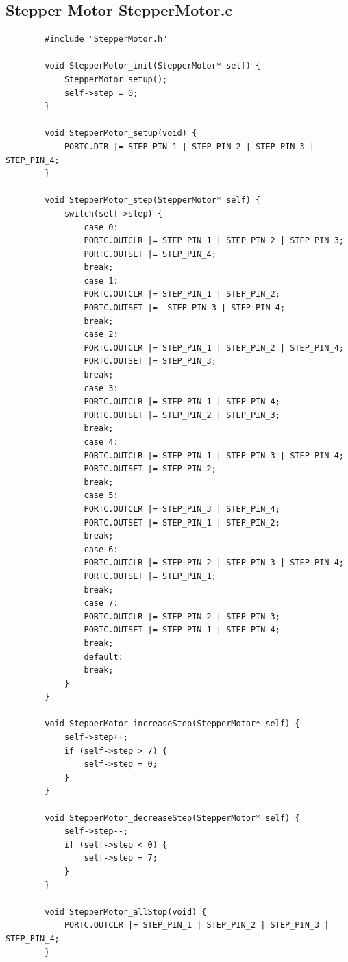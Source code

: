 \documentclass[11pt,a4paper,titlepage]{report}
\begin{document}
	\subsection{Stepper Motor StepperMotor.c}\label{appendix:final_code_stepper_motor_c}
	\begin{lstlisting}
		#include "StepperMotor.h"
		
		void StepperMotor_init(StepperMotor* self) {
			StepperMotor_setup();
			self->step = 0;
		}
		
		void StepperMotor_setup(void) {
			PORTC.DIR |= STEP_PIN_1 | STEP_PIN_2 | STEP_PIN_3 | STEP_PIN_4;
		}
		
		void StepperMotor_step(StepperMotor* self) {
			switch(self->step) {
				case 0:
				PORTC.OUTCLR |= STEP_PIN_1 | STEP_PIN_2 | STEP_PIN_3;
				PORTC.OUTSET |= STEP_PIN_4;
				break;     
				case 1:
				PORTC.OUTCLR |= STEP_PIN_1 | STEP_PIN_2;
				PORTC.OUTSET |=  STEP_PIN_3 | STEP_PIN_4;
				break;    
				case 2:
				PORTC.OUTCLR |= STEP_PIN_1 | STEP_PIN_2 | STEP_PIN_4;
				PORTC.OUTSET |= STEP_PIN_3;
				break;      
				case 3:
				PORTC.OUTCLR |= STEP_PIN_1 | STEP_PIN_4;
				PORTC.OUTSET |= STEP_PIN_2 | STEP_PIN_3;
				break;  
				case 4:
				PORTC.OUTCLR |= STEP_PIN_1 | STEP_PIN_3 | STEP_PIN_4;
				PORTC.OUTSET |= STEP_PIN_2;
				break;    
				case 5:
				PORTC.OUTCLR |= STEP_PIN_3 | STEP_PIN_4;
				PORTC.OUTSET |= STEP_PIN_1 | STEP_PIN_2;
				break;
				case 6:
				PORTC.OUTCLR |= STEP_PIN_2 | STEP_PIN_3 | STEP_PIN_4;
				PORTC.OUTSET |= STEP_PIN_1;
				break;
				case 7:
				PORTC.OUTCLR |= STEP_PIN_2 | STEP_PIN_3;
				PORTC.OUTSET |= STEP_PIN_1 | STEP_PIN_4;
				break;
				default:
				break;
			}
		}
		
		void StepperMotor_increaseStep(StepperMotor* self) {
			self->step++;
			if (self->step > 7) {
				self->step = 0;
			}
		}
		
		void StepperMotor_decreaseStep(StepperMotor* self) {
			self->step--;
			if (self->step < 0) {
				self->step = 7;
			}
		}
		
		void StepperMotor_allStop(void) {
			PORTC.OUTCLR |= STEP_PIN_1 | STEP_PIN_2 | STEP_PIN_3 | STEP_PIN_4;
		}
	\end{lstlisting}
	
\end{document}
